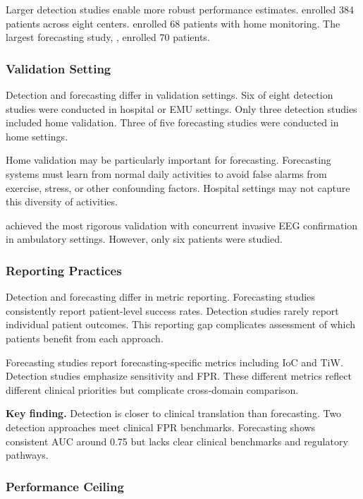 Larger detection studies enable more robust performance estimates. \textcite{spahrDeepLearningbasedDetection2025} enrolled 384 patients across eight centers. \textcite{dongTwoLayerEnsembleMethod2022} enrolled 68 patients with home monitoring. The largest forecasting study, \textcite{vielufSeizureMonitoringCombined2025}, enrolled 70 patients.

\subsubsection{Validation Setting}

Detection and forecasting differ in validation settings. Six of eight detection studies were conducted in hospital or EMU settings. Only three detection studies included home validation. Three of five forecasting studies were conducted in home settings.

Home validation may be particularly important for forecasting. Forecasting systems must learn from normal daily activities to avoid false alarms from exercise, stress, or other confounding factors. Hospital settings may not capture this diversity of activities.

\textcite{nasseriAmbulatorySeizureForecasting2021} achieved the most rigorous validation with concurrent invasive EEG confirmation in ambulatory settings. However, only six patients were studied.

\subsubsection{Reporting Practices}

Detection and forecasting differ in metric reporting. Forecasting studies consistently report patient-level success rates. Detection studies rarely report individual patient outcomes. This reporting gap complicates assessment of which patients benefit from each approach.

Forecasting studies report forecasting-specific metrics including IoC and TiW. Detection studies emphasize sensitivity and FPR. These different metrics reflect different clinical priorities but complicate cross-domain comparison.

\textbf{Key finding.} Detection is closer to clinical translation than forecasting. Two detection approaches meet clinical FPR benchmarks. Forecasting shows consistent AUC around 0.75 but lacks clear clinical benchmarks and regulatory pathways.

\subsubsection{Performance Ceiling}

